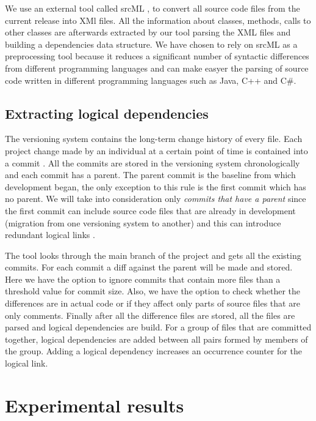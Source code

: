 \documentclass[a4paper,twoside]{article}
\begin{document}
 We use an external tool called srcML \cite{2003:XLC:851042.857028},
\cite{Collard:2011:LTF:2067850.2068011} to convert all source code files from the current release into XMl files. All the information about classes, methods, calls to other classes are afterwards extracted by our tool parsing the XML files and building a dependencies data structure. We have chosen to rely on srcML as a preprocessing tool because it reduces a significant number of syntactic differences from different programming languages and can make easyer the parsing of source code written in different programming languages such as Java, C++ and C\#.    

\subsection{Extracting logical dependencies}

The versioning system contains the long-term change history of every file. Each project change made by an individual at a certain point of time is contained into a commit \cite{svn}. All the commits are stored in the versioning system chronologically and each commit has a parent. The parent commit is the baseline from which development began, the only exception to this rule is the first commit which has no parent. We will take into consideration only \textit{commits that have a parent} since the first commit can include source code files that are already in development (migration from one versioning system to another) and this can introduce redundant logical links \cite{DBLP:journals/jss/AjienkaC17}. 

The tool looks through the main branch of the project and gets all the existing commits. For each commit a diff against the parent will be made and stored. Here we have the option to ignore commits that contain more files than a threshold value for commit size. Also, we have the option to check whether the differences are in actual code or if they affect only parts of source files that are only comments.  Finally after all the difference files are stored, all the files are parsed and logical dependencies are build. For a group of files that are committed together, logical dependencies are added between all pairs formed by members of the group. Adding a logical dependency increases an occurrence counter for the logical link. 

\section{Experimental results}
\label{sec:experiments}
\end{document}
